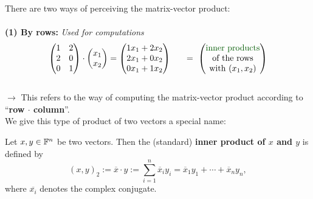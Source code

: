 \begin{frame}
There are two ways of perceiving the matrix-vector product:\\~\\
\textbf{(1) By rows:} \textit{Used for computations}\\
	$$
\laMatVal
\cdot 
\begin{pmatrix}
x_1\\ x_2
\end{pmatrix}
= 	\begin{pmatrix}
1x_1+2x_2\\ 2x_1+0x_2\\ 0x_1+1x_2
\end{pmatrix}
~~~~~= ~\begin{pmatrix}
\text{\color{defgruen}inner products}\\ \text{of the rows}\\ \text{with}~ (x_1, x_2)
\end{pmatrix}
$$
~\\
$\rightarrow$ This refers to the way of computing the matrix-vector product according to ``\textbf{row $\cdot$ column}''.
~\\\vspace{0.4cm}
We give this type of product of two vectors a special name: \vspace{-0.2cm}
\begin{defi}
	Let $x,y \in {\mathbb{F}}^n$ be two vectors. Then the (standard) \textbf{inner product of $x$ and $y$} is defined by
	\begin{equation*}
	 (x,y)_2 := \overline{x}  \cdot y := \sum_{i=1}^n \overline{x}_i {y}_i = \overline{x}_1{y}_1 + \cdots +\overline{x}_n{y}_n,
	\end{equation*}
	where $\overline{x_i}$ denotes the complex conjugate.\\
\end{defi}
\end{frame}
